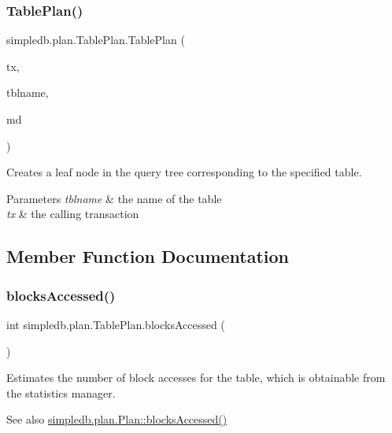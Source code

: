 \subsubsection{\texorpdfstring{Table\+Plan()}{TablePlan()}}
{\footnotesize\ttfamily simpledb.\+plan.\+Table\+Plan.\+Table\+Plan (\begin{DoxyParamCaption}\item[{\hyperlink{classsimpledb_1_1tx_1_1Transaction}{Transaction}}]{tx,  }\item[{String}]{tblname,  }\item[{\hyperlink{classsimpledb_1_1metadata_1_1MetadataMgr}{Metadata\+Mgr}}]{md }\end{DoxyParamCaption})\hspace{0.3cm}{\ttfamily [inline]}}

Creates a leaf node in the query tree corresponding to the specified table. 
\begin{DoxyParams}{Parameters}
{\em tblname} & the name of the table \\
\hline
{\em tx} & the calling transaction \\
\hline
\end{DoxyParams}


\subsection{Member Function Documentation}
\mbox{\label{classsimpledb_1_1plan_1_1TablePlan_a02096e40476829aa8df6de4519bfee33}} 
\subsubsection{\texorpdfstring{blocks\+Accessed()}{blocksAccessed()}}
{\footnotesize\ttfamily int simpledb.\+plan.\+Table\+Plan.\+blocks\+Accessed (\begin{DoxyParamCaption}{ }\end{DoxyParamCaption})\hspace{0.3cm}{\ttfamily [inline]}}

Estimates the number of block accesses for the table, which is obtainable from the statistics manager. \begin{DoxySeeAlso}{See also}
\hyperlink{interfacesimpledb_1_1plan_1_1Plan_a6a333b95b956fe224812155b9d1c8202}{simpledb.\+plan.\+Plan\+::blocks\+Accessed()} 
\end{DoxySeeAlso}


